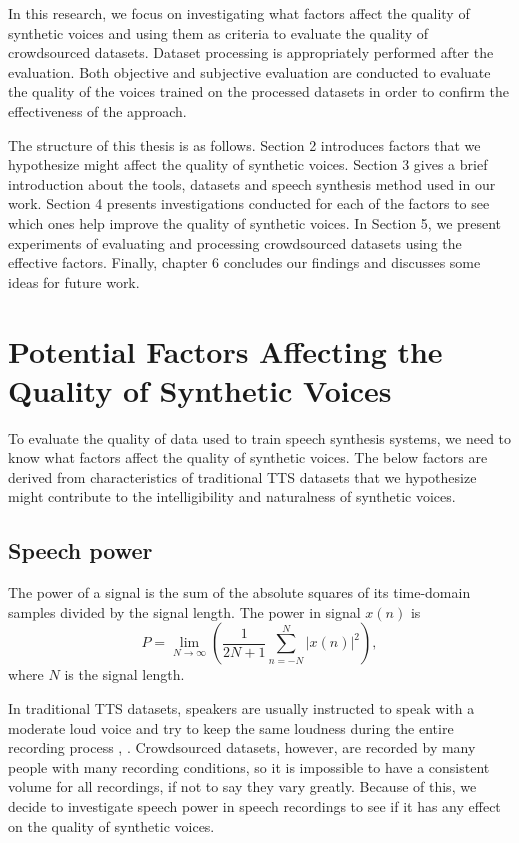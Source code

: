 \documentclass[12pt]{article}
\begin{document}
In this research, we focus on investigating what factors affect the quality of synthetic voices and using them as criteria to evaluate the quality of crowdsourced datasets. Dataset processing is appropriately performed after the evaluation. Both objective and subjective evaluation are conducted to evaluate the quality of the voices trained on the processed datasets in order to confirm the effectiveness of the approach.

The structure of this thesis is as follows. Section 2 introduces factors that we hypothesize might affect the quality of synthetic voices. Section 3 gives a brief introduction about the tools, datasets and speech synthesis method used in our work. Section 4 presents investigations conducted for each of the factors to see which ones help improve the quality of synthetic voices. In Section 5, we present experiments of evaluating and processing crowdsourced datasets using the effective factors. Finally, chapter 6 concludes our findings and discusses some ideas for future work.
 

\clearpage
\section{Potential Factors Affecting the Quality of Synthetic Voices}\label{sec_potentialFactors}
To evaluate the quality of data used to train speech synthesis systems, we need to know what factors affect the quality of synthetic voices. The below factors are derived from characteristics of traditional TTS datasets that we hypothesize might contribute to the intelligibility and naturalness of synthetic voices.

\subsection{Speech power}\label{subsec_speechPower}
The power of a signal is the sum of the absolute squares of its time-domain samples divided by the signal length. The power in signal $x(n)$ is
\begin{equation}\label{exp_power}
    P = \lim_{N\to\infty} (\frac{1}{2N+1}\sum_{n=-N}^{N} |x(n)|^2),
\end{equation}
where $N$ is the signal length.

In traditional TTS datasets, speakers are usually instructed to speak with a moderate loud voice and try to keep the same loudness during the entire recording process \cite{corpusRecording}, \cite{buildingCorpus}. Crowdsourced datasets, however, are recorded by many people with many recording conditions, so it is impossible to have a consistent volume for all recordings, if not to say they vary greatly. Because of this, we decide to investigate speech power in speech recordings to see if it has any effect on the quality of synthetic voices.
\end{document}
